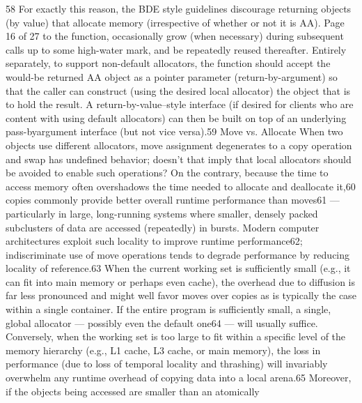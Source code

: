 58 For exactly this reason, the BDE style guidelines discourage returning objects (by value) that
allocate memory (irrespective of whether or not it is AA).
Page 16 of 27
to the function, occasionally grow (when necessary) during subsequent calls up to
some high-water mark, and be repeatedly reused thereafter.
Entirely separately, to support non-default allocators, the function should accept
the would-be returned AA object as a pointer parameter (return-by-argument) so that
the caller can construct (using the desired local allocator) the object that is to hold
the result. A return-by-value–style interface (if desired for clients who are content
with using default allocators) can then be built on top of an underlying pass-byargument interface (but not vice versa).59
Move vs. Allocate
When two objects use different allocators, move assignment degenerates to a copy
operation and swap has undefined behavior; doesn’t that imply that local allocators
should be avoided to enable such operations?
On the contrary, because the time to access memory often overshadows the time
needed to allocate and deallocate it,60 copies commonly provide better overall
runtime performance than moves61 — particularly in large, long-running systems
where smaller, densely packed subclusters of data are accessed (repeatedly) in
bursts. Modern computer architectures exploit such locality to improve runtime
performance62; indiscriminate use of move operations tends to degrade performance
by reducing locality of reference.63
When the current working set is sufficiently small (e.g., it can fit into main memory
or perhaps even cache), the overhead due to diffusion is far less pronounced and
might well favor moves over copies as is typically the case within a single container.
If the entire program is sufficiently small, a single, global allocator — possibly even
the default one64 — will usually suffice. Conversely, when the working set is too
large to fit within a specific level of the memory hierarchy (e.g., L1 cache, L3 cache,
or main memory), the loss in performance (due to loss of temporal locality and
thrashing) will invariably overwhelm any runtime overhead of copying data into a
local arena.65 Moreover, if the objects being accessed are smaller than an atomically

